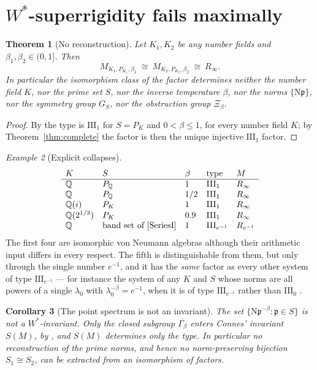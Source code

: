 \documentclass[11pt]{amsart}
\numberwithin{equation}{section}
\newtheorem{theorem}{Theorem}[section]
\newtheorem{corollary}[theorem]{Corollary}
\theoremstyle{definition}
\theoremstyle{remark}
\newtheorem{example}[theorem]{Example}
\newcommand{\Q}{\mathbb{Q}}
\newcommand{\pp}{\mathfrak{p}}
\newcommand{\Ns}{\mathrm{N}}
\begin{document}
\section{$W^*$-superrigidity fails maximally}

\begin{theorem}[No reconstruction]\label{thm:fails}
Let $K_1,K_2$ be any number fields and $\beta_1,\beta_2\in(0,1]$. Then
\[
M_{K_1,P_{K_1},\beta_1}\ \cong\ M_{K_2,P_{K_2},\beta_2}\ \cong\ R_\infty .
\]
In particular the isomorphism class of the factor determines neither the number field $K$,
nor the prime set $S$, nor the inverse temperature $\beta$, nor the norms $\{\Ns\pp\}$, nor
the symmetry group $G_S$, nor the obstruction group $\Xi_\beta$.
\end{theorem}

\begin{proof}
By \cite[Thm.~3.2]{SeriesI} the type is $\mathrm{III}_1$ for $S=P_K$ and $0<\beta\le1$, for
every number field $K$; by Theorem~\ref{thm:complete} the factor is then the unique injective
$\mathrm{III}_1$ factor.
\end{proof}

\begin{example}[Explicit collapses]\label{ex:collapse}
\[
\begin{array}{lllll}
K & S & \beta & \text{type} & M\\\hline
\Q & P_\Q & 1 & \mathrm{III}_1 & R_\infty\\
\Q & P_\Q & 1/2 & \mathrm{III}_1 & R_\infty\\
\Q(i) & P_K & 1 & \mathrm{III}_1 & R_\infty\\
\Q(2^{1/3}) & P_K & 0.9 & \mathrm{III}_1 & R_\infty\\
\Q & \text{band set of \cite[Thm.~4.2]{SeriesI}} & 1 & \mathrm{III}_{e^{-1}} & R_{e^{-1}}
\end{array}
\]
The first four are isomorphic von Neumann algebras although their arithmetic input differs in
every respect. The fifth is distinguishable from them, but only through the single number
$e^{-1}$, and it has the \emph{same} factor as every other system of type
$\mathrm{III}_{e^{-1}}$ --- for instance the system of any $K$ and $S$ whose norms are all
powers of a single $\lambda_0$ with $\lambda_0^{-\beta}=e^{-1}$, when it is of type
$\mathrm{III}_{e^{-1}}$ rather than $\mathrm{III}_0$ \cite[Prop.~6.1]{Main}.
\end{example}

\begin{corollary}[The point spectrum is not an invariant]\label{cor:pointspec}
The set $\{\Ns\pp^{-\beta}:\pp\in S\}$ is not a $W^*$-invariant. Only the closed subgroup
$\overline{\Gamma_\beta}$ enters Connes' invariant $S(M)$, by \cite[Prop.~6.1]{Main}, and
$S(M)$ determines only the type. In particular no reconstruction of the prime norms, and
hence no norm-preserving bijection $S_1\cong S_2$, can be extracted from an isomorphism of
factors.
\end{corollary}
\end{document}
